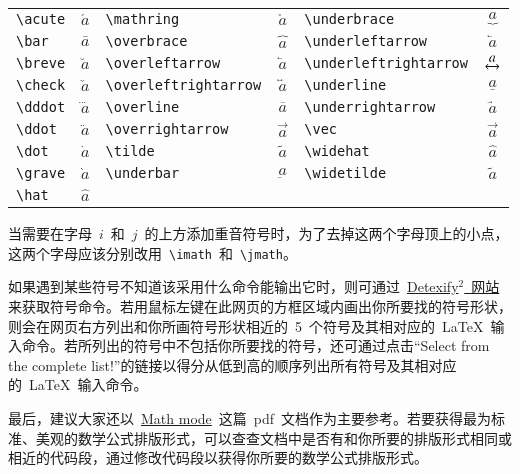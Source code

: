 \vspace{0.5em}\noindent\wuhao\begin{tabularx}{\textwidth}{Xc|Xc|Xc}
 \verb|\acute| & $\acute{a}$ & \verb|\mathring| & $\mathring{a}$ & \verb|\underbrace| & $\underbrace{a}$ \\
 \verb|\bar| & $\bar{a}$ & \verb|\overbrace| & $\overbrace{a}$ & \verb|\underleftarrow| & $\underleftarrow{a}$ \\
 \verb|\breve| & $\breve{a}$ & \verb|\overleftarrow| & $\overleftarrow{a}$ & \verb|\underleftrightarrow| & $\underleftrightarrow{a}$ \\
 \verb|\check| & $\check{a}$ & \verb|\overleftrightarrow| & $\overleftrightarrow{a}$ & \verb|\underline| & $\underline{a}$ \\
 \verb|\dddot| & $\dddot{a}$ & \verb|\overline| & $\overline{a}$ & \verb|\underrightarrow| & $\underrightarrow{a}$ \\
 \verb|\ddot| & $\ddot{a}$ & \verb|\overrightarrow| & $\overrightarrow{a}$ & \verb|\vec| & $\vec{a}$ \\
 \verb|\dot| & $\dot{a}$ & \verb|\tilde| & $\tilde{a}$ & \verb|\widehat| & $\widehat{a}$ \\
 \verb|\grave| & $\grave{a}$ & \verb|\underbar| & $\underbar{a}$ & \verb|\widetilde| & $\widetilde{a}$ \\
 \verb|\hat| & $\hat{a}$
\end{tabularx}\vspace{0.5em}
\xiaosi 当需要在字母~$i$~和~$j$~的上方添加重音符号时，为了去掉这两个字母顶上的小点，这两个字母应该分别改用~\verb|\imath|~和~\verb|\jmath|。

如果遇到某些符号不知道该采用什么命令能输出它时，则可通过~\href{http://detexify.kirelabs.org/classify.html}{Detexify$^2$~网站}来获取符号命令。若用鼠标左键在此网页的方框区域内画出你所要找的符号形状，则会在网页右方列出和你所画符号形状相近的~5~个符号及其相对应的~\LaTeX~输入命令。若所列出的符号中不包括你所要找的符号，还可通过点击“Select from the complete list!”的链接以得分从低到高的顺序列出所有符号及其相对应的~\LaTeX~输入命令。

最后，建议大家还以~\href{http://tug.ctan.org/cgi-bin/ctanPackageInformation.py?id=voss-mathmode}{Math mode}~这篇~pdf~文档作为主要参考。若要获得最为标准、美观的数学公式排版形式，可以查查文档中是否有和你所要的排版形式相同或相近的代码段，通过修改代码段以获得你所要的数学公式排版形式。

